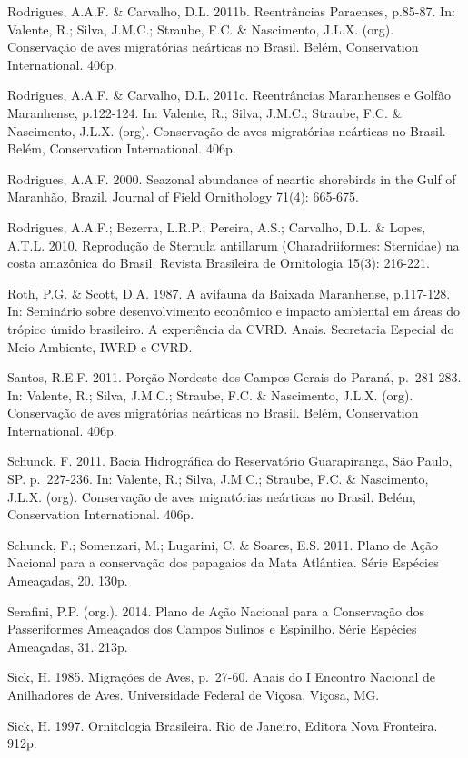 \documentclass[
  oneside]{scrbook}
\begin{document}
Rodrigues, A.A.F. \& Carvalho, D.L. 2011b. Reentrâncias Paraenses, p.85-87. In: Valente, R.; Silva, J.M.C.; Straube, F.C. \& Nascimento, J.L.X. (org). Conservação de aves migratórias neárticas no Brasil. Belém, Conservation International. 406p.

Rodrigues, A.A.F. \& Carvalho, D.L. 2011c. Reentrâncias Maranhenses e Golfão Maranhense, p.122-124. In: Valente, R.; Silva, J.M.C.; Straube, F.C. \& Nascimento, J.L.X. (org). Conservação de aves migratórias neárticas no Brasil. Belém, Conservation International. 406p.

Rodrigues, A.A.F. 2000. Seazonal abundance of neartic shorebirds in the Gulf of Maranhão, Brazil. Journal of Field Ornithology 71(4): 665-675.

Rodrigues, A.A.F.; Bezerra, L.R.P.; Pereira, A.S.; Carvalho, D.L. \& Lopes, A.T.L. 2010. Reprodução de Sternula antillarum (Charadriiformes: Sternidae) na costa amazônica do Brasil. Revista Brasileira de Ornitologia 15(3): 216-221.

Roth, P.G. \& Scott, D.A. 1987. A avifauna da Baixada Maranhense, p.117-128. In: Seminário sobre desenvolvimento econômico e impacto ambiental em áreas do trópico úmido brasileiro. A experiência da CVRD. Anais. Secretaria Especial do Meio Ambiente, IWRD e CVRD.

Santos, R.E.F. 2011. Porção Nordeste dos Campos Gerais do Paraná, p.~281-283. In: Valente, R.; Silva, J.M.C.; Straube, F.C. \& Nascimento, J.L.X. (org). Conservação de aves migratórias neárticas no Brasil. Belém, Conservation International. 406p.

Schunck, F. 2011. Bacia Hidrográfica do Reservatório Guarapiranga, São Paulo, SP. p.~227-236. In: Valente, R.; Silva, J.M.C.; Straube, F.C. \& Nascimento, J.L.X. (org). Conservação de aves migratórias neárticas no Brasil. Belém, Conservation International. 406p.

Schunck, F.; Somenzari, M.; Lugarini, C. \& Soares, E.S. 2011. Plano de Ação Nacional para a conservação dos papagaios da Mata Atlântica. Série Espécies Ameaçadas, 20. 130p.

Serafini, P.P. (org.). 2014. Plano de Ação Nacional para a Conservação dos Passeriformes Ameaçados dos Campos Sulinos e Espinilho. Série Espécies Ameaçadas, 31. 213p.

Sick, H. 1985. Migrações de Aves, p.~27-60. Anais do I Encontro Nacional de Anilhadores de Aves. Universidade Federal de Viçosa, Viçosa, MG.

Sick, H. 1997. Ornitologia Brasileira. Rio de Janeiro, Editora Nova Fronteira. 912p.
\end{document}
